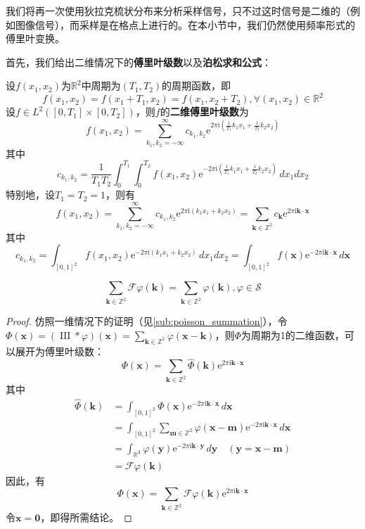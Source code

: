 \documentclass{ctexbook}
\newcommand{\shah}{\operatorname{III}}
\begin{document}
我们将再一次使用狄拉克梳状分布来分析采样信号，只不过这时信号是二维的（例如图像信号），而采样是在格点上进行的。在本小节中，我们仍然使用频率形式的傅里叶变换。

首先，我们给出二维情况下的\textbf{傅里叶级数}以及\textbf{泊松求和公式}：
\begin{definition}[二维傅里叶级数]
    设$f(x_1,x_2)$为$\mathbb{R}^2$中周期为$(T_1,T_2)$的周期函数，即
    \[f(x_1,x_2)=f(x_1+T_1,x_2)=f(x_1,x_2+T_2),\forall (x_1,x_2)\in\mathbb{R}^2\]
    设$f\in L^2([0,T_1]\times[0,T_2])$，则$f$的\textbf{二维傅里叶级数}为
    \[f(x_1,x_2)=\sum_{k_1,k_2=-\infty}^{\infty}c_{k_1,k_2}\mathrm{e}^{2\pi \mathrm{i}\left(\frac{1}{T_1}k_1 x_1+\frac{1}{T_2}k_2 x_2\right)}\]
    其中
    \[c_{k_1,k_2}=\frac{1}{T_1 T_2}\int_0^{T_1}\int_0^{T_2}f(x_1,x_2)\mathrm{e}^{-2\pi \mathrm{i}\left(\frac{1}{T_1}k_1 x_1+\frac{1}{T_2}k_2 x_2\right)}\,dx_1 dx_2\]
    特别地，设$T_1=T_2=1$，则有
    \[f(x_1,x_2)=\sum_{k_1,k_2=-\infty}^{\infty}c_{k_1,k_2}\mathrm{e}^{2\pi \mathrm{i}(k_1 x_1+k_2 x_2)}=\sum_{\mathbf{k}\in\mathbb{Z}^2}c_{\mathbf{k}}\mathrm{e}^{2\pi \mathrm{i}\mathbf{k\cdot x}}\]
    其中
    \[c_{k_1,k_2}=\int_{[0,1]^2}f(x_1,x_2)\mathrm{e}^{-2\pi \mathrm{i}(k_1 x_1+k_2 x_2)}\,dx_1 dx_2=\int_{[0,1]^2}f(\mathbf{x})\mathrm{e}^{-2\pi \mathrm{i} \mathbf{k}\cdot \mathbf{x}}\,d\mathbf{x}\]
\end{definition}
\begin{theorem}[二维泊松求和公式]
    \[\sum_{\mathbf{k}\in\mathbb{Z}^2}\mathcal{F} \varphi(\mathbf{k})=\sum_{\mathbf{k}\in\mathbb{Z}^2}\varphi(\mathbf{k}),\varphi\in\mathcal{S} \]
\end{theorem}
\begin{proof}
    仿照一维情况下的证明（见\ref{sub:poisson_summation}），令$\Phi(\mathbf{x})=(\shah *\varphi)(\mathbf{x})=\sum_{\mathbf{k}\in\mathbb{Z}^2}\varphi(\mathbf{x}-\mathbf{k})$，则$\Phi$为周期为1的二维函数，可以展开为傅里叶级数：
    \[\Phi(\mathbf{x})=\sum_{\mathbf{k}\in\mathbb{Z}^2}\hat{\Phi}(\mathbf{k})\mathrm{e}^{2\pi \mathrm{i} \mathbf{k}\cdot \mathbf{x}}\]
    其中\begin{align*}
        \hat{\Phi}(\mathbf{k})&=\int_{[0,1]^2}\Phi(\mathbf{x})\mathrm{e}^{-2\pi \mathrm{i}\mathbf{k}\cdot \mathbf{x}}\,d\mathbf{x}\\
        &=\int_{[0,1]^2}\sum_{\mathbf{m}\in\mathbb{Z}^2}\varphi(\mathbf{x}-\mathbf{m})\mathrm{e}^{-2\pi \mathrm{i}\mathbf{k}\cdot \mathbf{x}}\,d\mathbf{x}\\
        &=\int_{\mathbb{R}^2}\varphi(\mathbf{y})\mathrm{e}^{-2\pi \mathrm{i}\mathbf{k}\cdot \mathbf{y}}\,d\mathbf{y}\quad (\mathbf{y}=\mathbf{x}-\mathbf{m})\\
        &=\mathcal{F} \varphi(\mathbf{k})
    \end{align*}
    因此，有
    \[\Phi(\mathbf{x})=\sum_{\mathbf{k}\in\mathbb{Z}^2}\mathcal{F} \varphi(\mathbf{k})\mathrm{e}^{2\pi \mathrm{i} \mathbf{k}\cdot \mathbf{x}}\]
    令$\mathbf{x}=\mathbf{0}$，即得所需结论。
\end{proof}
\end{document}
